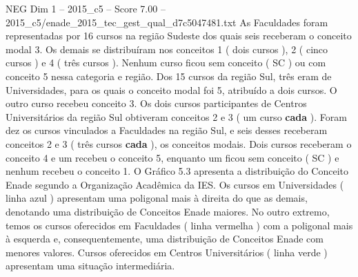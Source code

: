 \begin{textsample}{NEG Dim 1 – 2015\_c5 – Score 7.00 – 2015\_c5/enade\_2015\_tec\_gest\_qual\_d7c5047481.txt}
As Faculdades foram representadas por 16 cursos na região Sudeste dos quais seis receberam o conceito modal 3.
Os demais se distribuíram nos conceitos 1 ( dois cursos ), 2 ( cinco cursos ) e 4 ( três cursos ).
Nenhum curso ficou sem conceito ( SC ) ou com conceito 5 nessa categoria e região.
Dos 15 cursos da região Sul, três eram de Universidades, para os quais o conceito modal foi 5, atribuído a dois cursos.
O outro curso recebeu conceito 3.
Os dois cursos participantes de Centros Universitários da região Sul obtiveram conceitos 2 e 3 ( um curso \textbf{cada} ).
Foram dez os cursos vinculados a Faculdades na região Sul, e seis desses receberam conceitos 2 e 3 ( três cursos \textbf{cada} ), os conceitos modais.
Dois cursos receberam o conceito 4 e um recebeu o conceito 5, enquanto um ficou sem conceito ( SC ) e nenhum recebeu o conceito 1.
O Gráfico 5.3 apresenta a distribuição do Conceito Enade segundo a Organização Acadêmica da IES.
Os cursos em Universidades ( linha azul ) apresentam uma poligonal mais à direita do que as demais, denotando uma distribuição de Conceitos Enade maiores.
No outro extremo, temos os cursos oferecidos em Faculdades ( linha vermelha ) com a poligonal mais à esquerda e, consequentemente, uma distribuição de Conceitos Enade com menores valores.
Cursos oferecidos em Centros Universitários ( linha verde ) apresentam uma situação intermediária.

\end{textsample}
